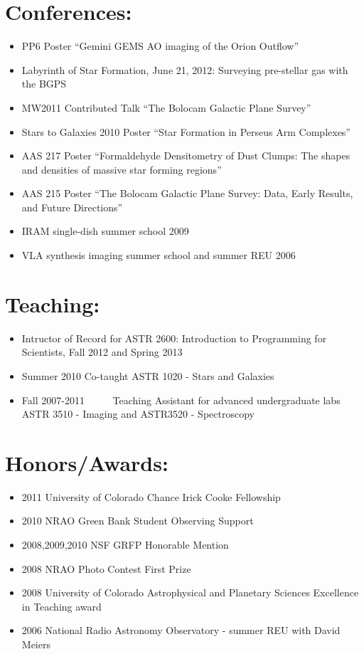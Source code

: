 \documentclass{article}
\begin{document}
\section*{Conferences: }
\begin{itemize}
    \item PP6 Poster ``Gemini GEMS AO imaging of the Orion Outflow''
    \item Labyrinth of Star Formation, June 21, 2012: Surveying pre-stellar gas with the BGPS 
    \item MW2011 Contributed Talk ``The Bolocam Galactic Plane Survey''
    \item Stars to Galaxies 2010 Poster ``Star Formation in Perseus Arm Complexes''
    \item AAS 217 Poster ``Formaldehyde Densitometry of Dust Clumps: The shapes and densities of massive star forming regions''
    \item AAS 215 Poster ``The Bolocam Galactic Plane Survey: Data, Early Results, and Future Directions''
    \item IRAM single-dish summer school 2009 
    \item VLA synthesis imaging summer school and summer REU 2006 
\end{itemize}


\section*{Teaching: }
\begin{itemize}
    \item Intructor of Record for ASTR 2600: Introduction to Programming for Scientists, Fall 2012 and Spring 2013 
    \item Summer 2010         Co-taught ASTR 1020 - Stars and Galaxies
    \item Fall 2007-2011      Teaching Assistant for advanced undergraduate labs ASTR 3510 - Imaging and ASTR3520 - Spectroscopy
\end{itemize}

\section*{Honors/Awards: }
\begin{itemize}
    \item 2011 University of Colorado Chance Irick Cooke Fellowship
    \item 2010 NRAO Green Bank Student Observing Support 
    \item 2008,2009,2010 NSF GRFP Honorable Mention 
    \item 2008 NRAO Photo Contest First Prize 
    \item 2008 University of Colorado Astrophysical and Planetary Sciences Excellence in Teaching award 
    \item 2006 National Radio Astronomy Observatory - summer REU with David Meiers 
\end{itemize}

\newpage
\nocite{*}
\begin{footnotesize}

%

\end{footnotesize}
\end{document}

